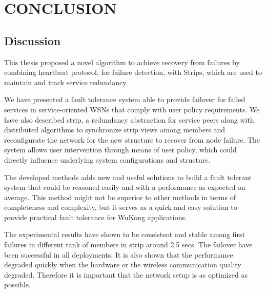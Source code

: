 \cleardoublepage
\singlespacing
\chapter{CONCLUSION}
\label{c:conclusion}
\doublespacing\nointerlineskip


\section{Discussion}

This thesis proposed a novel algorithm to achieve
recovery from failures by combining heartbeat protocol, for failure detection,
with Strips, which are used to maintain and track service redundancy.

We have presented a fault tolerance system able to provide failover for failed
services in service-oriented WSNs that comply with user policy requirements. We
have also described strip, a redundancy abstraction for service peers along with
distributed algorithms to synchronize strip views among members and
reconfigurate the network for the new structure to recover from node failure.
The system allows user intervention through means of user policy, which could
directly influence underlying system configurations and structure.

The developed methods adds new and useful solutions to build a fault tolerant
system that could be reasoned easily and with a performance as expected on
average. This method might not be superior to other methods in terms of
completeness and complexity, but it serves as a quick and easy solution
to provide practical fault tolerance for WuKong applications.


The experimental results have shown to be consistent and stable among first
failures in different rank of members in strip around 2.5 secs. The failover
have been successful in all deployments. It is also shown that the performance
degraded quickly when the hardware or the wireless communication quality
degraded. Therefore it is important that the network setup is as optimized as
possible. 

